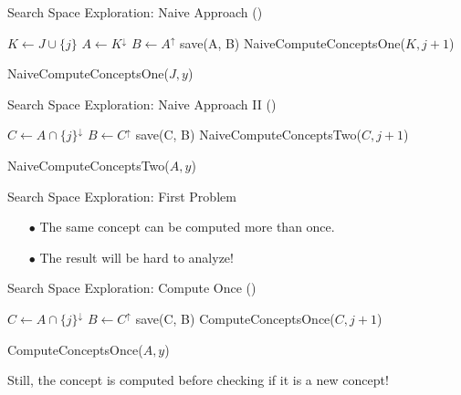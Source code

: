 \documentclass[pdf,xcolor=table]{beamer}
\begin{document}
\begin{frame}[t]{Search Space Exploration: Naive Approach (\cite{Andrews2015})}
\begin{algorithm}[H]
\begin{algorithmic}[1]
\STATE $K \leftarrow J \cup \{j\}$
\STATE $A \leftarrow K^\downarrow$ 
\STATE $B \leftarrow A^\uparrow$
\STATE save(A, B)
\STATE NaiveComputeConceptsOne($K, j + 1$)
\ENDFOR
\end{algorithmic}
\caption{NaiveComputeConceptsOne($J, y$)}
\label{alg:naive_one_imp}
\end{algorithm}
\end{frame}

\begin{frame}[t]{Search Space Exploration: Naive Approach II (\cite{Andrews2015})}
\begin{algorithm}[H]
\begin{algorithmic}[1]
\STATE $C \leftarrow A \cap \{j\}^\downarrow$
\STATE $B \leftarrow C^\uparrow$
\STATE save(C, B)
\STATE NaiveComputeConceptsTwo($C, j + 1$)
\ENDFOR
\end{algorithmic}
\caption{NaiveComputeConceptsTwo($A, y$)}
\label{alg:naive_two}
\end{algorithm}
\end{frame}

\begin{frame}[t]{Search Space Exploration: First Problem}
    \begin{itemize}
        \item[$\bullet$] The same concept can be computed more than once.
        \item[$\bullet$] The result will be hard to analyze!
    \end{itemize}
\end{frame}

\begin{frame}[t]{Search Space Exploration: Compute Once (\cite{Andrews2015})}
    \begin{algorithm}[H]
        \begin{algorithmic}[1]
            \STATE $C \leftarrow A \cap \{j\}^\downarrow$
            \STATE $B \leftarrow C^\uparrow$
            \STATE save(C, B)
            \STATE ComputeConceptsOnce($C, j + 1$)
            \ENDIF
            \ENDFOR
        \end{algorithmic}
        \caption{ComputeConceptsOnce($A, y$)}
        \label{alg:naive_once}
    \end{algorithm}
    Still, the concept is computed before checking if it is a new concept!
\end{frame}
\end{document}
